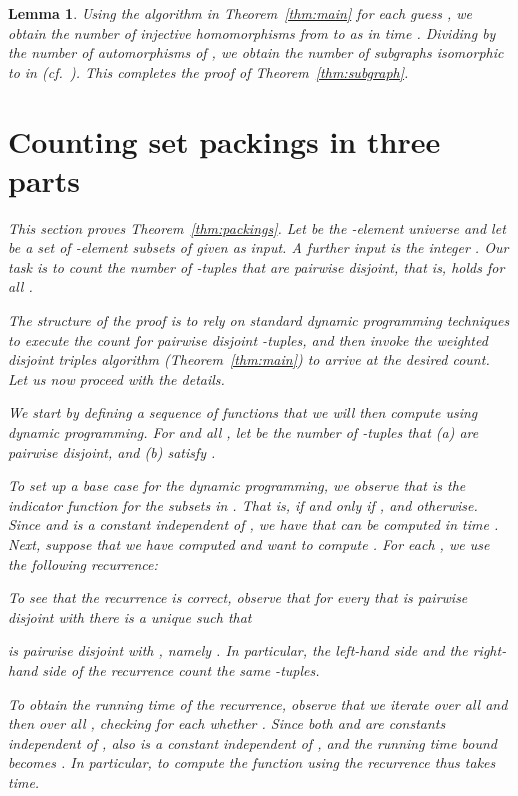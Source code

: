 \documentclass{amsart}
\newtheorem{Lem}{Lemma}
\begin{document}
\begin{Lem}
Using the algorithm in Theorem~\ref{thm:main} for each guess , 
we obtain the number of injective homomorphisms from  to  as 
 in time
. Dividing by the number
of automorphisms of , we obtain the number of subgraphs isomorphic 
to  in  (cf.~\cite[Theorem~2]{FLRRS12}). This completes the proof of 
Theorem~\ref{thm:subgraph}. 



\section{Counting set packings in three parts}
\label{sect:packings-in-three-parts}

This section proves Theorem~\ref{thm:packings}. 
Let  be the -element universe and let 
 be a set of -element subsets of 
given as input. A further input is the integer .
Our task is to count the number of 
-tuples  that
are pairwise disjoint, that is,  holds for all 
.

The structure of the proof is to rely on standard dynamic programming 
techniques to execute the count for pairwise disjoint -tuples, and 
then invoke the weighted disjoint triples algorithm (Theorem~\ref{thm:main}) 
to arrive at the desired count. Let us now proceed with the details.

We start by defining a sequence of functions 
 that we will
then compute using dynamic programming.
For  and all , let
 be the number of -tuples 
 that (a) are pairwise disjoint,
and (b) satisfy .

To set up a base case for the dynamic programming, we observe 
that  is the indicator function 
for the subsets in . That is,  if and only if
, and  otherwise. Since 
 and  is a constant independent of , 
we have that  can be computed in time .
Next, suppose that we have computed  and want to
compute . For each , we use the 
following recurrence:

To see that the recurrence is correct, observe that 
for every 
that is pairwise disjoint with 
there is a unique  such that

is pairwise disjoint with 
, namely .
In particular, the left-hand side and the right-hand side of the 
recurrence count the same -tuples. 

To obtain the running time of the recurrence, observe that we
iterate over all  and then over all
, checking for each  whether .
Since both  and  are constants independent of , 
also  is a constant independent of , and the running 
time bound becomes .
In particular, to compute the function  using the recurrence 
thus takes  time.


\end{Lem}
\end{document}
